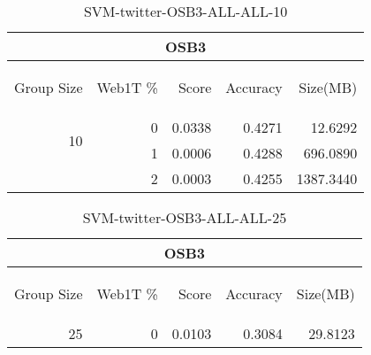 \begin{center}
\begin{table}[htbp] 
 \begin{center}
\begin{tabular}{ | r | r | r | r | r |}
\hline
\multicolumn{5}{|c|}{OSB3}\\
\hline
\begin{sideways}Group Size\end{sideways} & \begin{sideways}Web1T \%\end{sideways} & \begin{sideways}Score\end{sideways} & \begin{sideways}Accuracy\end{sideways} & \begin{sideways}Size(MB)\end{sideways}\\
\hline
\multirow{2}{*}{10}
 & 0 & 0.0338 & 0.4271 & 12.6292\\ \cline{2-5}
 & 1 & 0.0006 & 0.4288 & 696.0890\\ \cline{2-5}
 & 2 & 0.0003 & 0.4255 & 1387.3440\\ \cline{2-5}
\hline
\end{tabular}
\caption{SVM-twitter-OSB3-ALL-ALL-10}
\label{table:SVM-twitter-OSB3-ALL-ALL-10}
\end{center}
 \end{table}
\end{center}

\begin{center}
\begin{table}[htbp] 
 \begin{center}
\begin{tabular}{ | r | r | r | r | r |}
\hline
\multicolumn{5}{|c|}{OSB3}\\
\hline
\begin{sideways}Group Size\end{sideways} & \begin{sideways}Web1T \%\end{sideways} & \begin{sideways}Score\end{sideways} & \begin{sideways}Accuracy\end{sideways} & \begin{sideways}Size(MB)\end{sideways}\\
\hline
\multirow{0}{*}{25}
 & 0 & 0.0103 & 0.3084 & 29.8123\\ \cline{2-5}
\hline
\end{tabular}
\caption{SVM-twitter-OSB3-ALL-ALL-25}
\label{table:SVM-twitter-OSB3-ALL-ALL-25}
\end{center}
 \end{table}
\end{center}

